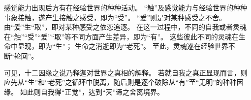 \documentclass[11pt]{article}
\begin{document}
\newline

感觉能力出现后方有在经验世界的种种活动。
“触”及感觉能力与经验世界的种种事象接触，遂产生接触之感受，即为“受”。
“爱”则是对某种感受之不舍。
由“爱”生“取”，即对某种感受之依恋追逐。
在这一过程中，不同的自我或者灵魂在“触”“受”“爱”“取”等不同方面产生差异，即为“有”。
这些彼此不同的灵魂在生命中显现，即为“生”；
生命之消逝即为“老死”。
至此，灵魂遂在经验世界不断“轮回”。

\newline

可见，十二因缘之说乃释迦对世界之真相的解释。
若就自我之真正显现而言，则应先从“生”和“老死”之循环中脱离，随后则是逐个破除从“有”至“无明”的种种因缘。
如此则自我得“正觉”，达到“灭”谛之舍离境界。
\end{document}
